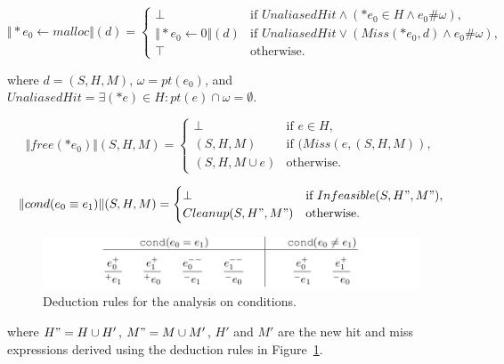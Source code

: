 \[
\Vert *e_0 \gets malloc \Vert(d)=\begin{cases}
\bot& \text{if $UnaliasedHit \wedge (*e_0 \in H \wedge e_0\#\omega)$},\\
\Vert *e_0 \gets 0 \Vert (d)& 
  \text{if $UnaliasedHit \vee (Miss(*e_0,d) \wedge e_0\#\omega)$},\\
\top& \text{otherwise}.
\end{cases}
\]

where $d=(S,H,M)$, $\omega=pt(e_0)$, and 
$UnaliasedHit=\exists(*e)\in H:pt(e)\cap\omega =\emptyset$.


\[
\Vert free(*e_0) \Vert(S,H,M)=\begin{cases}
\bot& \text{if $e \in H$},\\
(S,H,M)& \text{if $(Miss(e,(S,H,M))$},\\
(S,H,M\cup {e})& \text{otherwise}.
\end{cases}
\]


\[
\Vert cond(e_0\equiv e_1)\Vert(S,H,M)=\begin{cases}
\bot& \text{if $Infeasible(S,H",M")$},\\
Cleanup(S,H",M")& \text{otherwise}.
\end{cases}
\]

\begin{figure}
  \centering
  \includegraphics[width=1.0\columnwidth]{figs/rules_cond}
   \caption{Deduction rules for the analysis on conditions.}
   \label{fig:rule_cond}
\end{figure}

where $H"=H\cup H'$, $M"=M\cup M'$, $H'$ and $M'$ are the new hit and miss 
expressions derived using the deduction rules in Figure~\ref{fig:rule_cond}.
